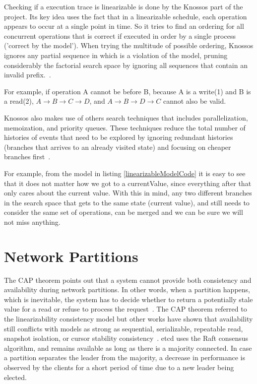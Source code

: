 \documentclass[12pt,conference]{IEEEtran}
\begin{document}
Checking if a execution trace is linearizable is done by the Knossos part of the project. Its key idea uses the fact that in a linearizable schedule, each operation appears to occur at a single point in time. So it tries to find an ordering for all concurrent operations that is correct if executed in order by a single process ('correct by the model'). When trying the multitude of possible ordering, Knossos ignores any partial sequence in which is a violation of the model, pruning considerably the factorial search space by ignoring all sequences that contain an invalid prefix.~\cite{knossosPostWebsite}.

For example, if operation A cannot be before B, because A is a write(1) and B is a read(2), $A \rightarrow B \rightarrow C \rightarrow D$, and $A \rightarrow B \rightarrow D \rightarrow C$ cannot also be valid.

Knossos also makes use of others search techniques that includes parallelization, memoization, and priority queues. These techniques reduce the total number of histories of events that need to be explored by ignoring redundant histories (branches that arrives to an already visited state) and focusing on cheaper branches first~\cite{knossosPostWebsite2}.

For example, from the model in listing \ref{linearizableModelCode} it is easy to see that it does not matter how we got to a currentValue, since everything after that only cares about the current value. With this in mind, any two different branches in the search space that gets to the same state (current value), and still needs to consider the same set of operations, can be merged and we can be sure we will not miss anything.

\section{Network Partitions}

The CAP theorem points out that a system cannot provide both consistency and availability during network partitions. In other words, when a partition happens, which is inevitable, the system has to decide whether to return a potentially stale value for a read or refuse to process the request~\cite{brewer2012cap}. The CAP theorem referred to the linearizability consistency model but other works have shown that availability still conflicts with models as strong as sequential, serializable, repeatable read, snapshot isolation, or cursor stability consistency~\cite{strongConsistencyWebsite,bailis2013hat}. etcd uses the Raft consensus algorithm, and remains available as long as there is a majority connected. In case a partition separates the leader from the majority, a decrease in performance is observed by the clients for a short period of time due to a new leader being elected.
\end{document}
